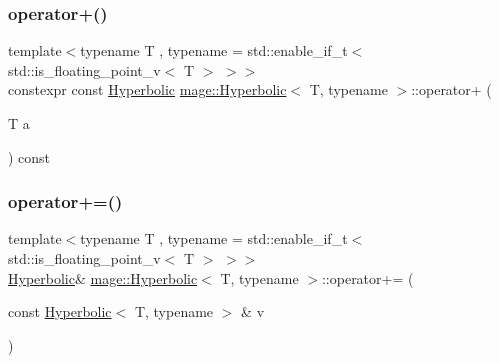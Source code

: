 \subsubsection{\texorpdfstring{operator+()}{operator+()}\hspace{0.1cm}{\footnotesize\ttfamily [3/3]}}
{\footnotesize\ttfamily template$<$typename T , typename  = std\+::enable\+\_\+if\+\_\+t$<$ std\+::is\+\_\+floating\+\_\+point\+\_\+v$<$ T $>$ $>$$>$ \\
constexpr const \mbox{\hyperlink{structmage_1_1_hyperbolic}{Hyperbolic}} \mbox{\hyperlink{structmage_1_1_hyperbolic}{mage\+::\+Hyperbolic}}$<$ T, typename $>$\+::operator+ (\begin{DoxyParamCaption}\item[{T}]{a }\end{DoxyParamCaption}) const\hspace{0.3cm}{\ttfamily [noexcept]}}

\mbox{\label{structmage_1_1_hyperbolic_a6a6b6036245e932f82cd47641a6b2eac}} 
\subsubsection{\texorpdfstring{operator+=()}{operator+=()}\hspace{0.1cm}{\footnotesize\ttfamily [1/2]}}
{\footnotesize\ttfamily template$<$typename T , typename  = std\+::enable\+\_\+if\+\_\+t$<$ std\+::is\+\_\+floating\+\_\+point\+\_\+v$<$ T $>$ $>$$>$ \\
\mbox{\hyperlink{structmage_1_1_hyperbolic}{Hyperbolic}}\& \mbox{\hyperlink{structmage_1_1_hyperbolic}{mage\+::\+Hyperbolic}}$<$ T, typename $>$\+::operator+= (\begin{DoxyParamCaption}\item[{const \mbox{\hyperlink{structmage_1_1_hyperbolic}{Hyperbolic}}$<$ T, typename $>$ \&}]{v }\end{DoxyParamCaption})\hspace{0.3cm}{\ttfamily [noexcept]}}

\mbox{\label{structmage_1_1_hyperbolic_ae9bc9bf1db1ba4968912368514ed02f9}} 
